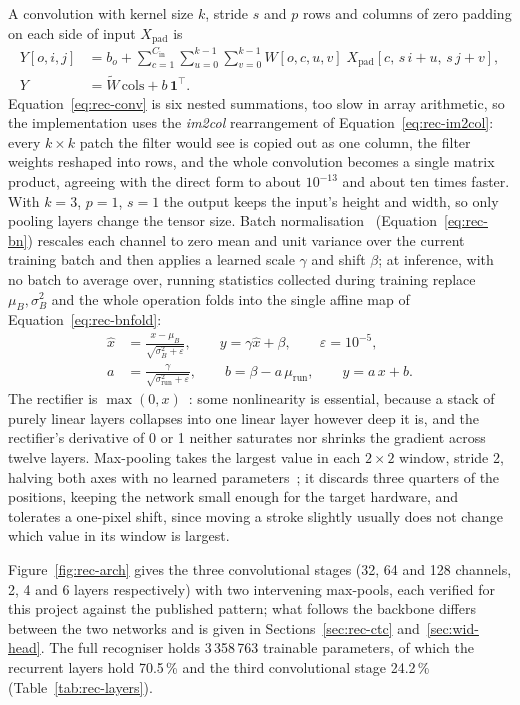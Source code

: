 A convolution with kernel size $k$, stride $s$ and $p$ rows and columns of zero padding on each side of input $X_{\mathrm{pad}}$ is
\begin{align}
Y[o,i,j]&=b_o+\sum_{c=1}^{C_{\mathrm{in}}}\sum_{u=0}^{k-1}\sum_{v=0}^{k-1}W[o,c,u,v]\;X_{\mathrm{pad}}[c,\,s\,i+u,\,s\,j+v],\label{eq:rec-conv}\\
Y&=\tilde W\,\mathrm{cols}+b\,\mathbf 1^{\top}.\label{eq:rec-im2col}
\end{align}
Equation~\ref{eq:rec-conv} is six nested summations, too slow in array arithmetic, so the implementation uses the \emph{im2col} rearrangement of Equation~\ref{eq:rec-im2col}: every $k\times k$ patch the filter would see is copied out as one column, the filter weights reshaped into rows, and the whole convolution becomes a single matrix product, agreeing with the direct form to about $10^{-13}$ and about ten times faster. With $k=3$, $p=1$, $s=1$ the output keeps the input's height and width, so only pooling layers change the tensor size. Batch normalisation~\cite[Alg.~1]{ioffe2015} (Equation~\ref{eq:rec-bn}) rescales each channel to zero mean and unit variance over the current training batch and then applies a learned scale $\gamma$ and shift $\beta$; at inference, with no batch to average over, running statistics collected during training replace $\mu_B,\sigma_B^2$ and the whole operation folds into the single affine map of Equation~\ref{eq:rec-bnfold}:
\begin{align}
\hat x&=\frac{x-\mu_B}{\sqrt{\sigma_B^2+\varepsilon}},\qquad y=\gamma\hat x+\beta,\qquad\varepsilon=10^{-5},\label{eq:rec-bn}\\
a&=\frac{\gamma}{\sqrt{\sigma^2_{\mathrm{run}}+\varepsilon}},\qquad b=\beta-a\,\mu_{\mathrm{run}},\qquad y=a\,x+b.\label{eq:rec-bnfold}
\end{align}
The rectifier is $\max(0,x)$~\cite[p.~807]{nair2010}: some nonlinearity is essential, because a stack of purely linear layers collapses into one linear layer however deep it is, and the rectifier's derivative of 0 or 1 neither saturates nor shrinks the gradient across twelve layers. Max-pooling takes the largest value in each $2\times2$ window, stride 2, halving both axes with no learned parameters~\cite{ji2021}; it discards three quarters of the positions, keeping the network small enough for the target hardware, and tolerates a one-pixel shift, since moving a stroke slightly usually does not change which value in its window is largest.

Figure~\ref{fig:rec-arch} gives the three convolutional stages (32, 64 and 128 channels, 2, 4 and 6 layers respectively) with two intervening max-pools, each verified for this project against the published pattern; what follows the backbone differs between the two networks and is given in Sections~\ref{sec:rec-ctc} and~\ref{sec:wid-head}. The full recogniser holds 3\,358\,763 trainable parameters, of which the recurrent layers hold 70.5\,\% and the third convolutional stage 24.2\,\% (Table~\ref{tab:rec-layers}).

